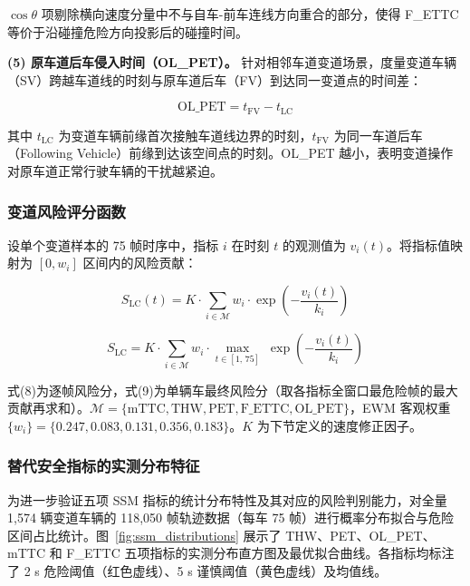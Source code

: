 \documentclass[preprint,review,12pt,a4paper]{elsarticle}
\begin{document}
$\cos\theta$ 项剔除横向速度分量中不与自车-前车连线方向重合的部分，使得 F\_ETTC 等价于沿碰撞危险方向投影后的碰撞时间。

\textbf{(5) 原车道后车侵入时间（OL\_PET）。} 针对相邻车道变道场景，度量变道车辆（SV）跨越车道线的时刻与原车道后车（FV）到达同一变道点的时间差：

\begin{equation}
\text{OL\_PET} = t_{\text{FV}} - t_{\text{LC}}
\end{equation}

其中 $t_{\text{LC}}$ 为变道车辆前缘首次接触车道线边界的时刻，$t_{\text{FV}}$ 为同一车道后车（Following Vehicle）前缘到达该空间点的时刻。OL\_PET 越小，表明变道操作对原车道正常行驶车辆的干扰越紧迫。

\subsubsection{变道风险评分函数}

设单个变道样本的 75 帧时序中，指标 $i$ 在时刻 $t$ 的观测值为 $v_i(t)$。将指标值映射为 $[0, w_i]$ 区间内的风险贡献：

\begin{equation}
S_{\text{LC}}(t) = K \cdot \sum_{i \in \mathcal{M}} w_i \cdot \exp\!\left(-\frac{v_i(t)}{k_i}\right)
\end{equation}

\begin{equation}
S_{\text{LC}} = K \cdot \sum_{i \in \mathcal{M}} w_i \cdot \max_{t \in [1,\,75]}\;\exp\!\left(-\frac{v_i(t)}{k_i}\right)
\end{equation}

式(8)为逐帧风险分，式(9)为单辆车最终风险分（取各指标全窗口最危险帧的最大贡献再求和）。$\mathcal{M} = \{\text{mTTC}, \text{THW}, \text{PET}, \text{F\_ETTC}, \text{OL\_PET}\}$，EWM 客观权重 $\{w_i\} = \{0.247, 0.083, 0.131, 0.356, 0.183\}$。$K$ 为下节定义的速度修正因子。

\subsubsection{替代安全指标的实测分布特征}

为进一步验证五项 SSM 指标的统计分布特性及其对应的风险判别能力，对全量 1,574 辆变道车辆的 118,050 帧轨迹数据（每车 75 帧）进行概率分布拟合与危险区间占比统计。图~\ref{fig:ssm_distributions} 展示了 THW、PET、OL\_PET、mTTC 和 F\_ETTC 五项指标的实测分布直方图及最优拟合曲线。各指标均标注了 2 s 危险阈值（红色虚线）、5 s 谨慎阈值（黄色虚线）及均值线。
\end{document}
